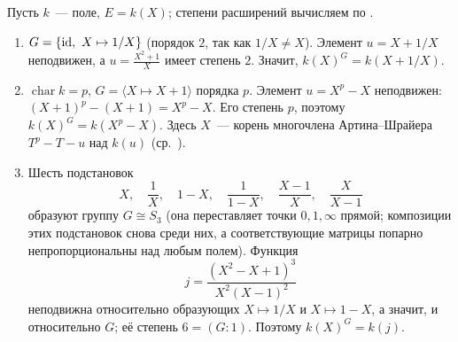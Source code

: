 \begin{example}[3.5c]
Пусть $k$~--- поле, $E=k(X)$; степени расширений вычисляем по .
\begin{enumerate}[label=\textup{(\arabic*)}]
\item $G=\{\operatorname{id},\ X\mapsto1/X\}$ (порядок $2$, так как $1/X\ne X$). Элемент $u=X+1/X$ неподвижен, а
$u=\frac{X^2+1}{X}$ имеет степень $2$. Значит, $k(X)^G=k(X+1/X)$.
\item $\operatorname{char}k=p$, $G=\langle X\mapsto X+1\rangle$ порядка $p$. Элемент $u=X^p-X$ неподвижен:
$(X+1)^p-(X+1)=X^p-X$. Его степень $p$, поэтому $k(X)^G=k(X^p-X)$. Здесь $X$~--- корень многочлена
Артина--Шрайера $T^p-T-u$ над $k(u)$ (ср.\ ).
\item Шесть подстановок
\[
X,\quad \frac1X,\quad 1-X,\quad \frac1{1-X},\quad \frac{X-1}X,\quad \frac X{X-1}
\]
образуют группу $G\cong S_3$ (она переставляет точки $0,1,\infty$ прямой; композиции этих подстановок снова среди них,
а соответствующие матрицы попарно непропорциональны над любым полем). Функция
\[
j=\frac{(X^2-X+1)^3}{X^2(X-1)^2}
\]
неподвижна относительно образующих $X\mapsto1/X$ и $X\mapsto1-X$, а значит, и относительно $G$; её степень $6=(G:1)$.
Поэтому $k(X)^G=k(j)$.
\end{enumerate}
\end{example}
